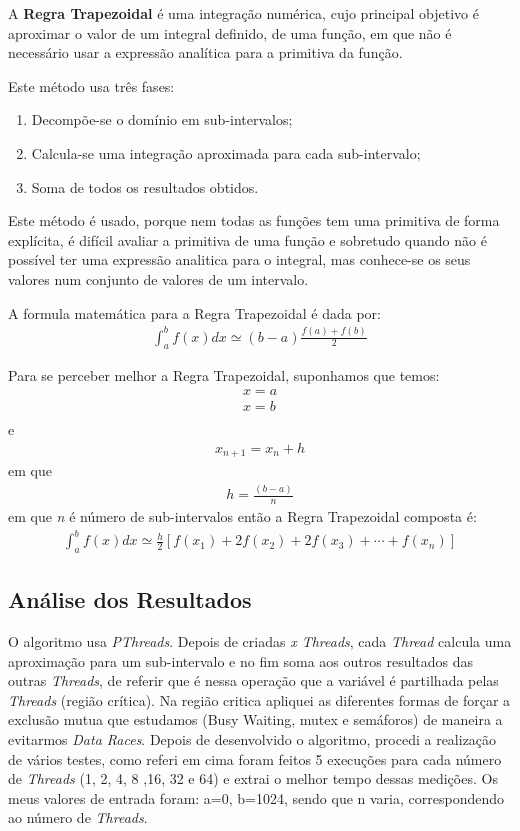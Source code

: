 \documentclass[conference,compsoc]{IEEEtran}
\begin{document}
A \textbf{Regra Trapezoidal} é uma integração numérica, cujo principal objetivo é aproximar o valor de um integral definido, de uma função, em que não é necessário usar a expressão analítica para a primitiva da função.

Este método usa três fases:
\begin{enumerate}
\item Decompõe-se o domínio em sub-intervalos;
\item Calcula-se uma integração aproximada para cada sub-intervalo;
\item Soma de todos os resultados obtidos.
\end{enumerate}

Este método é usado, porque nem todas as funções tem uma primitiva de forma explícita, é difícil avaliar a primitiva de uma função e sobretudo quando não é possível ter uma expressão analitica para o integral, mas conhece-se os seus valores num conjunto de valores de um intervalo.

A formula matemática para a Regra Trapezoidal é dada por:
\begin{gather*}
\int_{a}^{b} f(x) dx \simeq (b-a) \frac{f(a)+f(b)}{2}
\end{gather*}

Para se perceber melhor a Regra Trapezoidal, suponhamos que temos:
\begin{gather*}
x = a\\
x = b\\
\end{gather*}
e 
\begin{gather*}
x_{n+1} = x_{n} + h  
\end{gather*}
em que
\begin{gather*}
h = \frac{(b-a)}{n}
\end{gather*}
em que \textit{n} é número de sub-intervalos então a Regra Trapezoidal composta é:
\begin{gather*}
\int_{a}^{b}f(x)dx\simeq \frac{h}{2}\left [ f(x_{1})+2f(x_{2})+2f(x_{3})+\cdots +f(x_{n}) \right ]
\end{gather*}

\subsection{Análise dos Resultados}
O algoritmo usa \textit{PThreads}. Depois de criadas \textit{x Threads}, cada \textit{Thread} calcula uma aproximação para um sub-intervalo e no fim soma aos outros resultados das outras \textit{Threads}, de referir que é nessa operação que a variável é partilhada pelas \textit{Threads} (região crítica). Na região critica apliquei as diferentes formas de forçar a exclusão mutua que estudamos (Busy Waiting, mutex e semáforos) de maneira a evitarmos \textit{Data Races}.  
Depois de desenvolvido o algoritmo, procedi a realização de vários testes, como referi em cima foram feitos 5 execuções para cada número de \textit{Threads} (1, 2, 4, 8 ,16, 32 e 64) e extrai o melhor tempo dessas medições. Os meus valores de entrada foram: a=0, b=1024, sendo que n varia, correspondendo ao número de \textit{Threads}. 
\end{document}
